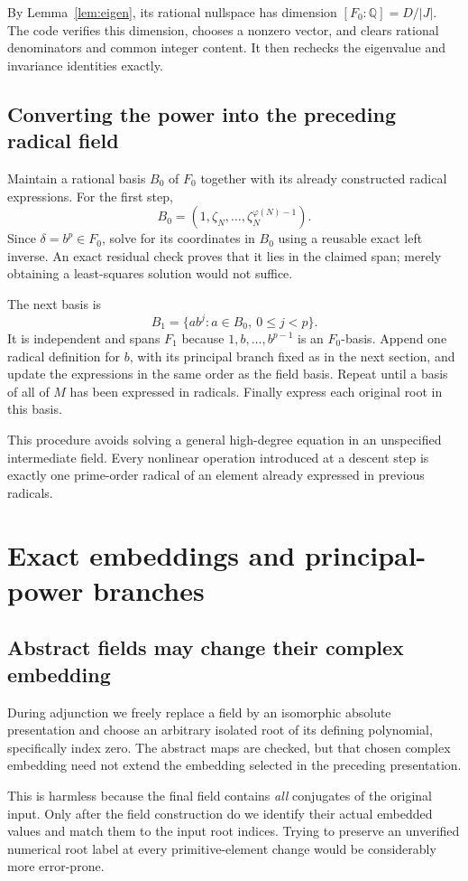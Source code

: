 \documentclass[11pt,letterpaper]{article}
\theoremstyle{definition}\newtheorem{definition}[theorem]{Definition}
\theoremstyle{remark}\newtheorem{remark}[theorem]{Remark}
\newcommand{\Q}{\mathbb Q}\newcommand{\C}{\mathbb C}\newcommand{\Z}{\mathbb Z}
\begin{document}
By Lemma~\ref{lem:eigen}, its rational nullspace has dimension $[F_0:\Q]=D/|J|$. The code verifies this dimension, chooses a nonzero vector, and clears rational denominators and common integer content. It then rechecks the eigenvalue and invariance identities exactly.

\subsection{Converting the power into the preceding radical field}
Maintain a rational basis $B_0$ of $F_0$ together with its already constructed radical expressions. For the first step,
\[
 B_0=(1,\zeta_N,\ldots,\zeta_N^{\varphi(N)-1}).
\]
Since $\delta=b^p\in F_0$, solve for its coordinates in $B_0$ using a reusable exact left inverse. An exact residual check proves that it lies in the claimed span; merely obtaining a least-squares solution would not suffice.

The next basis is
\[
 B_1=\{a b^j:a\in B_0,\ 0\leq j<p\}.
\]
It is independent and spans $F_1$ because $1,b,\ldots,b^{p-1}$ is an $F_0$-basis. Append one radical definition for $b$, with its principal branch fixed as in the next section, and update the expressions in the same order as the field basis. Repeat until a basis of all of $M$ has been expressed in radicals. Finally express each original root in this basis.

This procedure avoids solving a general high-degree equation in an unspecified intermediate field. Every nonlinear operation introduced at a descent step is exactly one prime-order radical of an element already expressed in previous radicals.

\section{Exact embeddings and principal-power branches}\label{sec:branches}
\subsection{Abstract fields may change their complex embedding}
During adjunction we freely replace a field by an isomorphic absolute presentation and choose an arbitrary isolated root of its defining polynomial, specifically index zero. The abstract maps are checked, but that chosen complex embedding need not extend the embedding selected in the preceding presentation.

This is harmless because the final field contains \emph{all} conjugates of the original input. Only after the field construction do we identify their actual embedded values and match them to the input root indices. Trying to preserve an unverified numerical root label at every primitive-element change would be considerably more error-prone.
\end{document}
